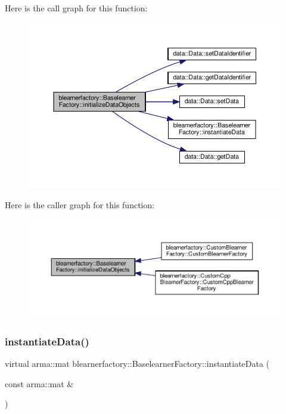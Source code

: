 Here is the call graph for this function\+:
\nopagebreak
\begin{figure}[H]
\begin{center}
\leavevmode
\includegraphics[width=350pt]{classblearnerfactory_1_1_baselearner_factory_a147d4ef123ec382fe402d562a91df4d2_cgraph}
\end{center}
\end{figure}
Here is the caller graph for this function\+:
\nopagebreak
\begin{figure}[H]
\begin{center}
\leavevmode
\includegraphics[width=350pt]{classblearnerfactory_1_1_baselearner_factory_a147d4ef123ec382fe402d562a91df4d2_icgraph}
\end{center}
\end{figure}
\mbox{\label{classblearnerfactory_1_1_baselearner_factory_ac4a38c4815fb33b8d4785745117c5e57}} 
\subsubsection{\texorpdfstring{instantiate\+Data()}{instantiateData()}}
{\footnotesize\ttfamily virtual arma\+::mat blearnerfactory\+::\+Baselearner\+Factory\+::instantiate\+Data (\begin{DoxyParamCaption}\item[{const arma\+::mat \&}]{ }\end{DoxyParamCaption})\hspace{0.3cm}{\ttfamily [pure virtual]}}



